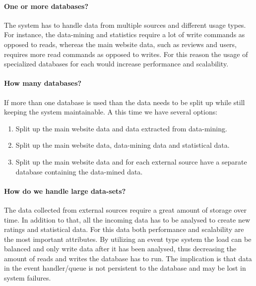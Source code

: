 \paragraph{One or more databases?}
The system has to handle data from multiple sources and different usage types. For instance, the data-mining and statistics require a lot of write commands as opposed to reads, whereas the main website data, such as reviews and users, requires more read commands as opposed to writes. For this reason the usage of specialized databases for each would increase performance and scalability.

\paragraph{How many databases?}
If more than one database is used than  the data needs to be split up while still keeping the system maintainable. 
A this time we have several options:
\begin{enumerate}
\item Split up the main website data and data extracted from data-mining.
\item Split up the main website data, data-mining data and statistical data.
\item Split up the main website data and for each external source have a separate database containing the data-mined data.
\end{enumerate}

\paragraph{How do we handle large data-sets?}
The data collected from external sources require a great amount of storage over time. In addition to that, all the incoming data has to be analysed to create new ratings and statistical data. For this data both performance and scalability are the most important attributes.
By utilizing an event type system the load can be balanced and only write data after it has been analysed, thus decreasing the amount of reads and writes the database has to run. The implication is that data in the event handler/queue is not persistent to the database and may be lost in system failures.

